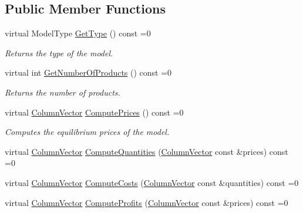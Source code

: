 \subsection*{Public Member Functions}
\begin{DoxyCompactItemize}
\item 
\mbox{\label{classModelInterface_a20747f88123506d46b2374d5dec47184}} 
virtual Model\+Type \hyperlink{classModelInterface_a20747f88123506d46b2374d5dec47184}{Get\+Type} () const =0
\begin{DoxyCompactList}\small\item\em Returns the type of the model. \end{DoxyCompactList}\item 
\mbox{\label{classModelInterface_abb173c60dc16ba8b0e087f8edbbeb5b9}} 
virtual int \hyperlink{classModelInterface_abb173c60dc16ba8b0e087f8edbbeb5b9}{Get\+Number\+Of\+Products} () const =0
\begin{DoxyCompactList}\small\item\em Returns the number of products. \end{DoxyCompactList}\item 
\mbox{\label{classModelInterface_adc2c55b551054c0a98869bc0497919a8}} 
virtual \hyperlink{classColumnVector}{Column\+Vector} \hyperlink{classModelInterface_adc2c55b551054c0a98869bc0497919a8}{Compute\+Prices} () const =0
\begin{DoxyCompactList}\small\item\em Computes the equilibrium prices of the model. \end{DoxyCompactList}\item 
virtual \hyperlink{classColumnVector}{Column\+Vector} \hyperlink{classModelInterface_af9a936f6f0d1b1f0f2c5bf35785e7db4}{Compute\+Quantities} (\hyperlink{classColumnVector}{Column\+Vector} const \&prices) const =0
\item 
virtual \hyperlink{classColumnVector}{Column\+Vector} \hyperlink{classModelInterface_ac0a7cc3db9fc177dc75f16abf00275a7}{Compute\+Costs} (\hyperlink{classColumnVector}{Column\+Vector} const \&quantities) const =0
\item 
virtual \hyperlink{classColumnVector}{Column\+Vector} \hyperlink{classModelInterface_a311a000060cece8fc1058cd27bf07864}{Compute\+Profits} (\hyperlink{classColumnVector}{Column\+Vector} const \&prices) const =0

\end{DoxyCompactItemize}
